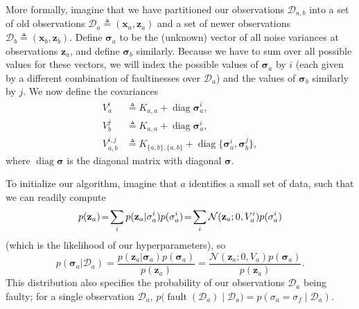 \documentclass{article}
\newcommand{\deq}{\ensuremath{\triangleq}}
\newcommand{\given}{\ensuremath{\mid}}
\newcommand{\cm}[1]{\ensuremath{\mathcal{#1}}}
\newcommand{\bm}[1]{\ensuremath{\mathbf{#1}}}
\newcommand{\data}{\ensuremath{\cm{D}}}
\newcommand{\vect}[1]{\bm{#1}}
\newcommand{\vz}{\vect{z}}
\newcommand{\vx}{\vect{x}}
\newcommand{\vs}{\vect{\sigma}}
\newcommand{\fPr}{p}
\newcommand{\Prob}[2]{\fPr(#1 \given #2 )}
\newcommand{\ps}[2]{p(#1\vert#2)}
\newcommand{\N}[3]{\cm{N}( #1;#2,#3 )}
\newcommand{\defequal}{\triangleq}
\DeclareMathOperator{\fault}{fault}
\DeclareMathOperator{\diag}{diag}
\begin{document}
More formally, imagine that we have partitioned our observations
$\data_{a,b}$ into a set of old observations
$\data_a\deq(\vx_a,\vz_a)$ and a set of newer observations $\data_b
\deq (\vx_b,\vz_b)$. Define $\vs_{a}$ to be the (unknown) vector of
all noise variances at observations $\vz_{a}$, and define $\vs_{b}$
similarly. Because we have to sum over all possible values for these
vectors, we will index the possible values of
$\vs_{a}$ by $i$ (each given by a different combination of
faultinesses over $\data_a$) and the values of $\vs_{b}$ similarly by
$j$. We now define the covariances
\begin{align*}
 V_a^i & \defequal K_{a,a} + \diag \vs_{a}^i,\\
 V_b^j & \defequal K_{a,a} + \diag \vs_{a}^i, \\
 V_{a,b}^{i,j} & \defequal K_{\{a,b\},\{a,b\}} + \diag \{\vs_{a}^i,\vs_{b}^j\},
\end{align*}
where $\diag \vs$ is the diagonal matrix with diagonal $\vs$. 

To initialize our algorithm, imagine that $a$ identifies a small set
of data, such that we can readily compute
\begin{equation}
 \hspace{-0.0cm}p(\vz_a)\!=\!\sum_i  \ps{\vz_a}{\vs^i_a}\fPr(\vs^i_a)
\!=\! \sum_i \N{\vz_a}{0}{V_a^i}\fPr(\vs_a^i) \label{eq:likelihood_a}
\end{equation}
(which is the likelihood of our hyperparameters), so
\begin{equation*}
\ps{\vs_a}{\data_{a}} 
= \frac{\ps{\vz_a}{\vs_a}\fPr(\vs_a)}{p(\vz_a)} 
= \frac{\N{\vz_a}{0}{V_a} \fPr(\vs_a)}{p(\vz_a)}\label{eq:psa}.
\end{equation*}
This distribution also specifies the probability of our observations
$\data_a$ being faulty; for a single observation $\data_a$,
$
p\bigl(\fault(\data_a) \given \data_{a}\bigr) = \Prob{\sigma_a = \sigma_f}{\data_{a}}
$.
\end{document}
